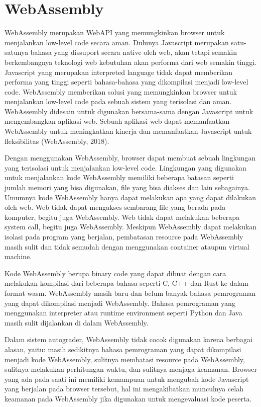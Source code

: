 \section{WebAssembly}

\par WebAssembly merupakan WebAPI yang memungkinkan browser untuk menjalankan low-level code secara aman. Dulunya Javascript merupakan satu-satunya bahasa yang dissuport secara native oleh web, akan tetapi semakin berkembangnya teknologi web kebutuhan akan performa dari web semakin tinggi. Javascript yang merupakan interpreted language tidak dapat memberikan performa yang tinggi seperti bahasa-bahasa yang dikompilasi menjadi low-level code. WebAssembly memberikan solusi yang memungkinkan browser untuk menjalankan low-level code pada sebuah sistem yang terisolasi dan aman. WebAssembly didesain untuk digunakan bersama-sama dengan Javascript untuk mengembangkan aplikasi web. Sebuah aplikasi web dapat memanfaatkan WebAssembly untuk meningkatkan kinerja dan memanfaatkan Javascript untuk fleksibilitas (WebAssembly, 2018).

\par Dengan menggunakan WebAssembly, browser dapat membuat sebuah lingkungan yang terisolasi untuk menjalankan low-level code. Lingkungan yang digunakan untuk menjalankan kode WebAssembly memiliki beberapa batasan seperti jumlah memori yang bisa digunakan, file yang bisa diakses dan lain sebagainya. Umumnya kode WebAssembly hanya dapat melakukan apa yang dapat dilakukan oleh web. Web tidak dapat mengakses sembarang file yang berada pada komputer, begitu juga WebAssembly. Web tidak dapat melakukan beberapa system call, begitu juga WebAssembly. Meskipun WebAssembly dapat melakukan isolasi pada program yang berjalan, pembatasan resource pada WebAssembly masih sulit dan tidak semudah dengan menggunakan container ataupun virtual machine. 

\par Kode WebAssembly berupa binary code yang dapat dibuat dengan cara melakukan kompilasi dari beberapa bahasa seperti C, C++ dan Rust ke dalam format wasm. WebAssembly masih baru dan belum banyak bahasa pemrograman yang dapat dikompilasi menjadi WebAssembly. Bahasa pemrograman yang menggunakan interpreter atau runtime environment seperti Python dan Java masih sulit dijalankan di dalam WebAssembly.

\par Dalam sistem autograder, WebAssembly tidak cocok digunakan karena berbagai alasan, yaitu: masih sedikitnya bahasa pemrograman yang dapat dikompilasi menjadi kode WebAssembly, sulitnya membatasi resource pada WebAssembly, sulitnya melakukan perhitungan waktu, dan sulitnya menjaga keamanan. Browser yang ada pada saati ini memiliki kemampuan untuk mengubah kode Javascript yang berjalan pada browser tersebut, hal ini mengakibatkan munculnya celah keamanan pada WebAssembly jika digunakan untuk mengevaluasi kode peserta.
